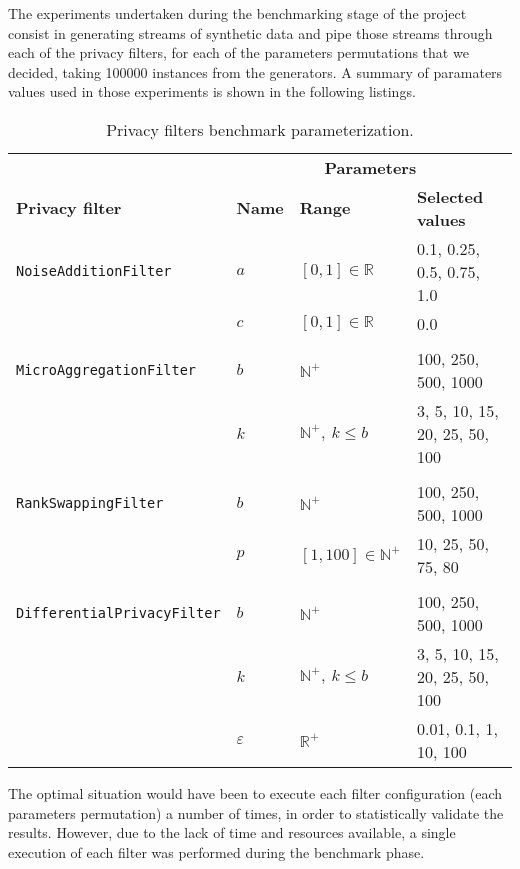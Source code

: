 The experiments undertaken during the benchmarking stage of the project consist in generating streams of synthetic data and pipe those streams through each of the privacy filters, for each of the parameters permutations that we decided, taking 100000 instances from the generators. A summary of paramaters values used in those experiments is shown in the following listings.

\begin{table}[H]
	\centering
	\begin{tabular}{@{}llll@{}}
		\toprule
		& \multicolumn{3}{c}{\textbf{Parameters}} \\ \cmidrule{2-4}
		\textbf{Privacy filter} & \small\textbf{Name} & \small\textbf{Range} & \small\textbf{Selected values} \\ \midrule
		
		\footnotesize\texttt{NoiseAdditionFilter} & $a$ & $[0,1] \in \mathbb{R}$ & 0.1, 0.25, 0.5, 0.75, 1.0 \\
		& $c$ & $[0,1] \in \mathbb{R}$ & 0.0 \\
		&&&\\
		\footnotesize\texttt{MicroAggregationFilter} & $b$ & $\mathbb{N}^+$ & 100, 250, 500, 1000 \\
		& $k$ & $\mathbb{N}^+,~k \leq b$ & 3, 5, 10, 15, 20, 25, 50, 100 \\
		&&&\\
		\footnotesize\texttt{RankSwappingFilter} & $b$ & $\mathbb{N}^+$ & 100, 250, 500, 1000 \\
		& $p$ & $[1,100] \in \mathbb{N}^+$ & 10, 25, 50, 75, 80 \\
		&&&\\	
		\footnotesize\texttt{DifferentialPrivacyFilter} & $b$ & $\mathbb{N}^+$ & 100, 250, 500, 1000 \\
		& $k$ & $\mathbb{N}^+,~k \leq b$ & 3, 5, 10, 15, 20, 25, 50, 100 \\
		& $\varepsilon$ & $\mathbb{R}^+$ & 0.01, 0.1, 1, 10, 100 \\
		
		\bottomrule
	\end{tabular}
	\caption[Privacy filters benchmark parameterization.]{Privacy filters benchmark parameterization.}
	\label{table:filter-params-execution}
\end{table}

The optimal situation would have been to execute each filter configuration (each parameters permutation) a number of times, in order to statistically validate the results. However, due to the lack of time and resources available, a single execution of each filter was performed during the benchmark phase.

